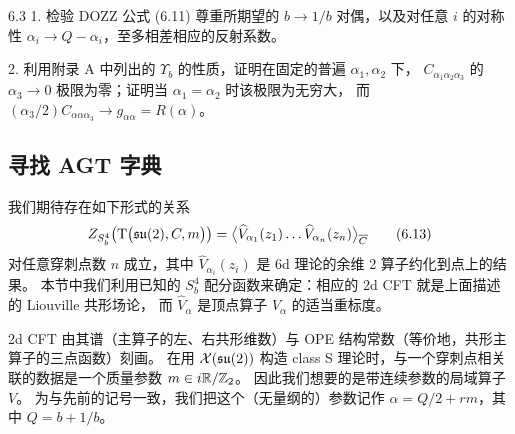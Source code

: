 
\begin{exercise}{6.3}
1. 检验 DOZZ 公式 (6.11) 尊重所期望的 $b\to 1/b$ 对偶，以及对任意 $i$ 的对称性
$\alpha_i\to Q-\alpha_i$，至多相差相应的反射系数。

2. 利用附录 A 中列出的 $\Upsilon_b$ 的性质，证明在固定的普遍 $\alpha_1,\alpha_2$ 下，
$C_{\alpha_1\alpha_2\alpha_3}$ 的 $\alpha_3\to 0$ 极限为零；证明当 $\alpha_1=\alpha_2$ 时该极限为无穷大，
而 $(\alpha_3/2)C_{\alpha\alpha\alpha_3}\to g_{\alpha\alpha}=R(\alpha)$。
\end{exercise}

\subsection{寻找 AGT 字典}

我们期待存在如下形式的关系
\begin{equation}
Z_{S^4_b}\big(\mathrm{T}\big(\mathfrak{su}(2),C,m\big)\big)
=\big\langle \widehat{V}_{\alpha_1}(z_1)\dots\widehat{V}_{\alpha_n}(z_n)\big\rangle_{\overline{C}}
\tag{6.13}
\end{equation}
对任意穿刺点数 $n$ 成立，其中 $\widehat{V}_{\alpha_i}(z_i)$ 是 6d 理论的余维 2 算子约化到点上的结果。
本节中我们利用已知的 $S^4_b$ 配分函数来确定：相应的 2d CFT 就是上面描述的 Liouville 共形场论，
而 $\widehat{V}_\alpha$ 是顶点算子 $V_\alpha$ 的适当重标度。

2d CFT 由其谱（主算子的左、右共形维数）与 OPE 结构常数（等价地，共形主算子的三点函数）刻画。
在用 $\mathcal{X}(\mathfrak{su}(2))$ 构造 class S 理论时，与一个穿刺点相关联的数据是一个质量参数 $m\in i\mathbb{R}/\mathbb{Z}_2$。
因此我们想要的是带连续参数的局域算子 $V$。
为与先前的记号一致，我们把这个（无量纲的）参数记作 $\alpha=Q/2+rm$，其中 $Q=b+1/b$。

